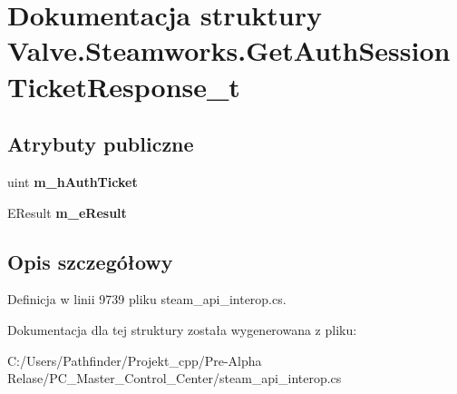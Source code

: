 \hypertarget{struct_valve_1_1_steamworks_1_1_get_auth_session_ticket_response__t}{}\section{Dokumentacja struktury Valve.\+Steamworks.\+Get\+Auth\+Session\+Ticket\+Response\+\_\+t}
\label{struct_valve_1_1_steamworks_1_1_get_auth_session_ticket_response__t}
\subsection*{Atrybuty publiczne}
\begin{DoxyCompactItemize}
\item 
\mbox{\label{struct_valve_1_1_steamworks_1_1_get_auth_session_ticket_response__t_a683435af367a9766bf5e0990ae5b9ab6}} 
uint {\bfseries m\+\_\+h\+Auth\+Ticket}
\item 
\mbox{\label{struct_valve_1_1_steamworks_1_1_get_auth_session_ticket_response__t_ad0695f539af4a2ca04c7fcd640c6e047}} 
E\+Result {\bfseries m\+\_\+e\+Result}
\end{DoxyCompactItemize}


\subsection{Opis szczegółowy}


Definicja w linii 9739 pliku steam\+\_\+api\+\_\+interop.\+cs.



Dokumentacja dla tej struktury została wygenerowana z pliku\+:\begin{DoxyCompactItemize}
\item 
C\+:/\+Users/\+Pathfinder/\+Projekt\+\_\+cpp/\+Pre-\/\+Alpha Relase/\+P\+C\+\_\+\+Master\+\_\+\+Control\+\_\+\+Center/steam\+\_\+api\+\_\+interop.\+cs\end{DoxyCompactItemize}
